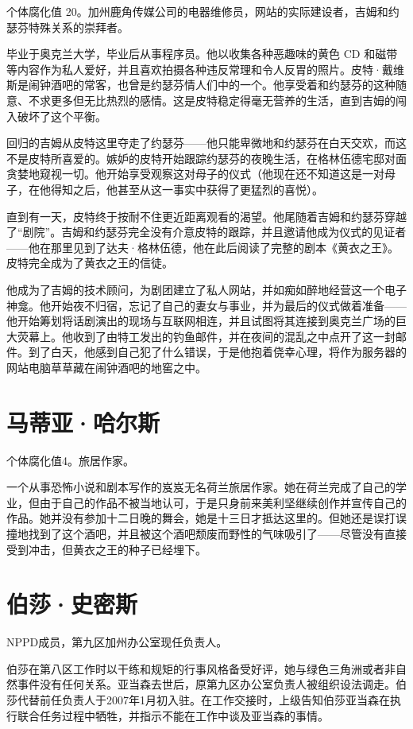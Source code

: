 个体腐化值 20。加州鹿角传媒公司的电器维修员，网站的实际建设者，吉姆和约瑟芬特殊关系的崇拜者。

毕业于奥克兰大学，毕业后从事程序员。他以收集各种恶趣味的黄色 CD 和磁带等内容作为私人爱好，并且喜欢拍摄各种违反常理和令人反胃的照片。皮特·戴维斯是闹钟酒吧的常客，也曾是约瑟芬情人们中的一个。他享受着和约瑟芬的这种随意、不求更多但无比热烈的感情。这是皮特稳定得毫无营养的生活，直到吉姆的闯入破坏了这个平衡。

回归的吉姆从皮特这里夺走了约瑟芬——他只能卑微地和约瑟芬在白天交欢，而这不是皮特所喜爱的。嫉妒的皮特开始跟踪约瑟芬的夜晚生活，在格林伍德宅邸对面贪婪地窥视一切。他开始享受观察这对母子的仪式（他现在还不知道这是一对母子，在他得知之后，他甚至从这一事实中获得了更猛烈的喜悦）。

直到有一天，皮特终于按耐不住更近距离观看的渴望。他尾随着吉姆和约瑟芬穿越了“剧院”。吉姆和约瑟芬完全没有介意皮特的跟踪，并且邀请他成为仪式的见证者——他在那里见到了达夫·格林伍德，他在此后阅读了完整的剧本《黄衣之王》。皮特完全成为了黄衣之王的信徒。

他成为了吉姆的技术顾问，为剧团建立了私人网站，并如痴如醉地经营这一个电子神龛。他开始夜不归宿，忘记了自己的妻女与事业，并为最后的仪式做着准备——他开始筹划将话剧演出的现场与互联网相连，并且试图将其连接到奥克兰广场的巨大荧幕上。他收到了由特工发出的钓鱼邮件，并在夜间的混乱之中点开了这一封邮件。到了白天，他感到自己犯了什么错误，于是他抱着侥幸心理，将作为服务器的网站电脑草草藏在闹钟酒吧的地窖之中。

\section{马蒂亚·哈尔斯}

个体腐化值4。旅居作家。

一个从事恐怖小说和剧本写作的岌岌无名荷兰旅居作家。她在荷兰完成了自己的学业，但由于自己的作品不被当地认可，于是只身前来美利坚继续创作并宣传自己的作品。她并没有参加十二日晚的舞会，她是十三日才抵达这里的。但她还是误打误撞地找到了这个酒吧，并且被这个酒吧颓废而野性的气味吸引了——尽管没有直接受到冲击，但黄衣之王的种子已经埋下。

\section{伯莎·史密斯}

NPPD成员，第九区加州办公室现任负责人。

伯莎在第八区工作时以干练和规矩的行事风格备受好评，她与绿色三角洲或者非自然事件没有任何关系。亚当森去世后，原第九区办公室负责人被组织设法调走。伯莎代替前任负责人于2007年1月初入驻。在工作交接时，上级告知伯莎亚当森在执行联合任务过程中牺牲，并指示不能在工作中谈及亚当森的事情。

